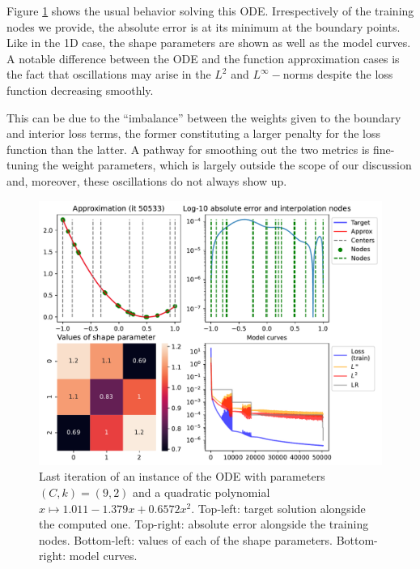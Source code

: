 \documentclass[12pt]{report} %
\begin{document}
Figure \ref{fig:ode-1d-example-training} shows the usual behavior solving this ODE. Irrespectively of the training nodes we provide, the absolute error is at its minimum at the boundary points. Like in the 1D case, the shape parameters are shown as well as the model curves. A notable difference between the ODE and the function approximation cases is the fact that oscillations may arise in the $L^2$ and $L^\infty-$norms despite the loss function decreasing smoothly.

This can be due to the ``imbalance'' between the weights given to the boundary and interior loss terms, the former constituting a larger penalty for the loss function than the latter. A pathway for smoothing out the two metrics is fine-tuning the weight parameters, which is largely outside the scope of our discussion and, moreover, these oscillations do not always show up.

\begin{figure}[h]
  \includegraphics[width=\textwidth]{imagenes/experiments/1d/ode/TR18-C9-Kgaussian_kernel-Poly2-Sh1.25-15.csv-E50533.pdf}
  \caption{Last iteration of an instance of the ODE with parameters $(C,k)=(9,2)$ and a quadratic polynomial $x\mapsto 1.011-1.379x+0.6572x^2$. Top-left: target solution alongside the computed one. Top-right: absolute error alongside the training nodes. Bottom-left: values of each of the shape parameters. Bottom-right: model curves.}
  \label{fig:ode-1d-example-training}
\end{figure}
\end{document}
